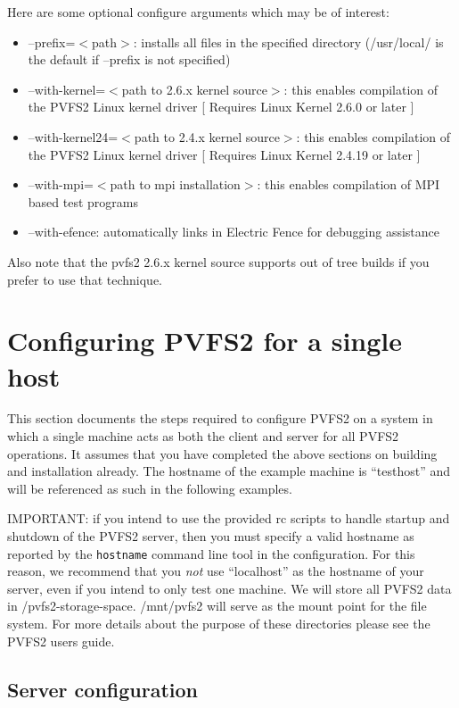 \documentclass[11pt, letterpaper]{article}
\begin{document}
Here are some optional configure arguments which may be of interest:
\begin{itemize}
\item --prefix=$<$path$>$: installs all files in the specified
directory (/usr/local/ is the default if --prefix is not specified)
\item --with-kernel=$<$path to 2.6.x kernel source$>$: this enables
compilation of the PVFS2 Linux kernel driver [ Requires Linux Kernel
2.6.0 or later ]
\item --with-kernel24=$<$path to 2.4.x kernel source$>$: this enables
compilation of the PVFS2 Linux kernel driver [ Requires Linux Kernel
2.4.19 or later ]
\item --with-mpi=$<$path to mpi installation$>$: this enables
compilation of MPI based test programs
\item --with-efence: automatically links in Electric Fence for
debugging assistance
\end{itemize}

Also note that the pvfs2 2.6.x kernel source supports out of tree
builds if you prefer to use that technique.

\section{Configuring PVFS2 for a single host}
\label{sec:single}

This section documents the steps required to configure PVFS2 on a system
in which a single machine acts as both the client and server for all
PVFS2 operations.  It assumes that you have completed the above sections
on building and installation already.  The hostname of the example machine
is ``testhost'' and will be referenced as such in the following examples.

IMPORTANT: if you intend to use the provided rc scripts to handle startup
and shutdown of the PVFS2 server, then you must specify a valid hostname 
as reported by the \texttt{hostname} command line tool in the configuration.
For this reason, we recommend that you \emph{not} use ``localhost'' as 
the hostname of your server, even if you intend to only test one machine.
We will store all PVFS2 data in /pvfs2-storage-space.  /mnt/pvfs2 will
serve as the mount point for the file system.  For more details about
the purpose of these directories please see the PVFS2 users guide.

\subsection{Server configuration}
\end{document}
